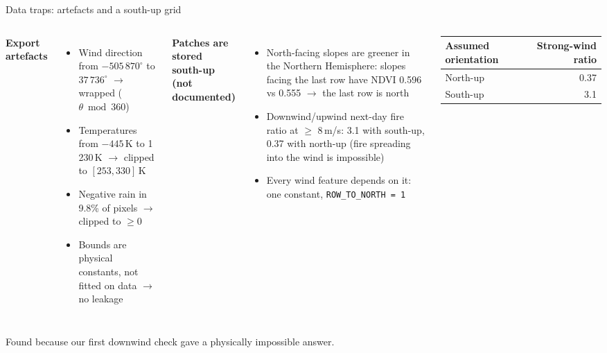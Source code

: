 \documentclass[aspectratio=169,11pt]{beamer}
\newcommand{\src}[1]{\par\vfill{\scriptsize\color{muted}#1}}
\begin{document}
\begin{frame}{Data traps: artefacts and a south-up grid}
\begin{columns}[T]
{\color{accent}\bfseries Export artefacts}
\footnotesize
\begin{itemize}
\item Wind direction from $-505\,870^\circ$ to $37\,736^\circ$ $\rightarrow$ wrapped ($\theta \bmod 360$)
\item Temperatures from $-445$\,K to 1\,230\,K $\rightarrow$ clipped to $[253, 330]$\,K
\item Negative rain in 9.8\% of pixels $\rightarrow$ clipped to $\geq 0$
\item Bounds are physical constants, not fitted on data $\rightarrow$ no leakage
\end{itemize}
{\color{accent}\bfseries Patches are stored south-up (not documented)}
\footnotesize
\begin{itemize}
\item North-facing slopes are greener in the Northern Hemisphere: slopes facing the last row have NDVI 0.596 vs 0.555 $\rightarrow$ the last row is north
\item Downwind/upwind next-day fire ratio at $\geq$ 8\,m/s: 3.1 with south-up, 0.37 with north-up (fire spreading into the wind is impossible)
\item Every wind feature depends on it: one constant, \texttt{ROW\_TO\_NORTH = 1}
\end{itemize}
\vspace{0.2em}
\centering
\footnotesize
\begin{tabular}{@{}l r@{}}
\toprule
Assumed orientation & Strong-wind ratio \\
\midrule
North-up & 0.37 \\
South-up & 3.1 \\
\bottomrule
\end{tabular}
\end{columns}
\src{Found because our first downwind check gave a physically impossible answer.}
\end{frame}
\end{document}
